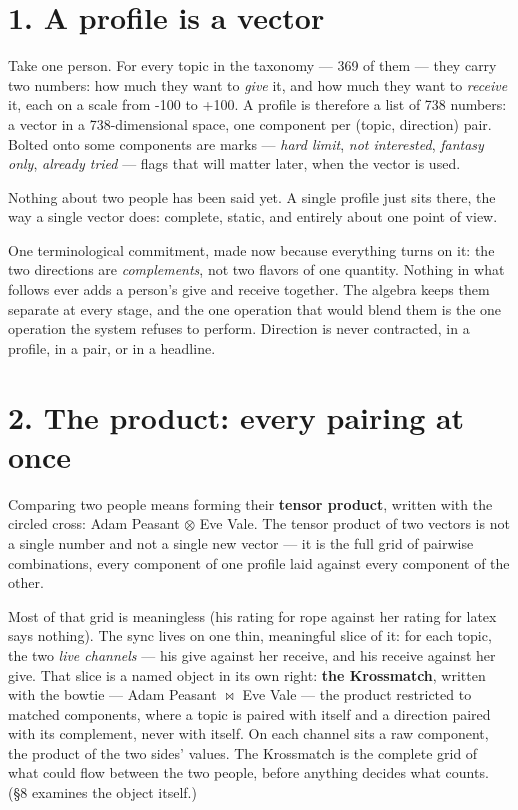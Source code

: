 \section{1. A profile is a vector}\label{a-profile-is-a-vector}

Take one person. For every topic in the taxonomy --- 369 of them ---
they carry two numbers: how much they want to \emph{give} it, and how
much they want to \emph{receive} it, each on a scale from -100 to +100.
A profile is therefore a list of 738 numbers: a vector in a
738-dimensional space, one component per (topic, direction) pair. Bolted
onto some components are marks --- \emph{hard limit}, \emph{not
interested}, \emph{fantasy only}, \emph{already tried} --- flags that
will matter later, when the vector is used.

Nothing about two people has been said yet. A single profile just sits
there, the way a single vector does: complete, static, and entirely
about one point of view.

One terminological commitment, made now because everything turns on it:
the two directions are \emph{complements}, not two flavors of one
quantity. Nothing in what follows ever adds a person's give and receive
together. The algebra keeps them separate at every stage, and the one
operation that would blend them is the one operation the system refuses
to perform. Direction is never contracted, in a profile, in a pair, or
in a headline.

\section{2. The product: every pairing at
once}\label{the-product-every-pairing-at-once}

Comparing two people means forming their \textbf{tensor product},
written with the circled cross: Adam Peasant $\otimes$ Eve Vale. The tensor
product of two vectors is not a single number and not a single new
vector --- it is the full grid of pairwise combinations, every component
of one profile laid against every component of the other.

Most of that grid is meaningless (his rating for rope against her rating
for latex says nothing). The sync lives on one thin, meaningful slice of
it: for each topic, the two \emph{live channels} --- his give against
her receive, and his receive against her give. That slice is a named
object in its own right: \textbf{the Krossmatch}, written with the
bowtie --- Adam Peasant $\bowtie$ Eve Vale --- the product restricted to matched
components, where a topic is paired with itself and a direction paired
with its complement, never with itself. On each channel sits a raw
component, the product of the two sides' values. The Krossmatch is the
complete grid of what could flow between the two people, before anything
decides what counts. (\S 8 examines the object itself.)

